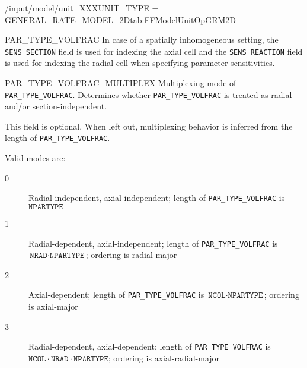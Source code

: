 \begin{condsubgroup}{/input/model/unit\_XXX}{UNIT\_TYPE = GENERAL\_RATE\_MODEL\_2D}{tab:FFModelUnitOpGRM2D}
\begin{dataset}[unit=--,type=double,range={$[0,1]$},length={see \texttt{PAR\_TYPE\_VOLFRAC\_MULTIPLEX}}]{PAR\_TYPE\_VOLFRAC}
    In case of a spatially inhomogeneous setting, the \texttt{SENS\_SECTION} field is used for indexing the axial cell and the \texttt{SENS\_REACTION} field is used for indexing the radial cell when specifying parameter sensitivities.
  \end{dataset}
  \begin{dataset}[unit=--,type=int,range={$\{0, \dots, 3 \}$},length={1}]{PAR\_TYPE\_VOLFRAC\_MULTIPLEX}
    Multiplexing mode of \texttt{PAR\_TYPE\_VOLFRAC}.
    Determines whether \texttt{PAR\_TYPE\_VOLFRAC} is treated as radial- and/or section-independent.

    This field is optional.
    When left out, multiplexing behavior is inferred from the length of \texttt{PAR\_TYPE\_VOLFRAC}.

    Valid modes are:
    \begin{description}
      \item[0] Radial-independent, axial-independent; length of \texttt{PAR\_TYPE\_VOLFRAC} is $\texttt{NPARTYPE}$
      \item[1] Radial-dependent, axial-independent; length of \texttt{PAR\_TYPE\_VOLFRAC} is $\texttt{NRAD} \cdot \texttt{NPARTYPE}$; ordering is radial-major
      \item[2] Axial-dependent; length of \texttt{PAR\_TYPE\_VOLFRAC} is $\texttt{NCOL} \cdot \texttt{NPARTYPE}$; ordering is axial-major
      \item[3] Radial-dependent, axial-dependent; length of \texttt{PAR\_TYPE\_VOLFRAC} is $\texttt{NCOL} \cdot \texttt{NRAD} \cdot \texttt{NPARTYPE}$; ordering is axial-radial-major
    \end{description}\vspace{-\baselineskip}
  \end{dataset}
\end{condsubgroup}

